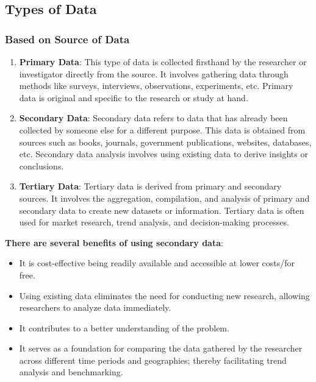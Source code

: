 \documentclass{article}
\begin{document}
        \subsection{Types of Data}
            \subsubsection{Based on Source of Data}
            \begin{enumerate}
                \item \textbf{Primary Data}: This type of data is collected firsthand by the researcher or investigator directly from the source. It involves gathering data through methods like surveys, interviews, observations, experiments, etc. Primary data is original and specific to the research or study at hand.
        
                \item \textbf{Secondary Data}: Secondary data refers to data that has already been collected by someone else for a different purpose. This data is obtained from sources such as books, journals, government publications, websites, databases, etc. Secondary data analysis involves using existing data to derive insights or conclusions.
        
                \item \textbf{Tertiary Data}: Tertiary data is derived from primary and secondary sources. It involves the aggregation, compilation, and analysis of primary and secondary data to create new datasets or information. Tertiary data is often used for market research, trend analysis, and decision-making processes.
            \end{enumerate}
            \bigskip

            \noindent \textbf{There are several benefits of using secondary data}:
            \begin{itemize}
                \item It is cost-effective being readily available and accessible at lower costs/for free.
                \item Using existing data eliminates the need for conducting new research, allowing researchers to analyze data immediately.
                \item It contributes to a better understanding of the problem.
                \item It serves as a foundation for comparing the data gathered by the researcher across different time periods and geographies; thereby facilitating trend analysis and benchmarking.
            \end{itemize}
            
\end{document}
